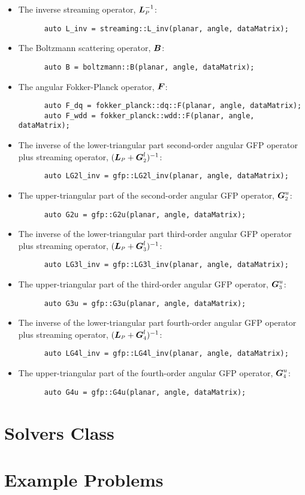 \documentclass[../main.tex]{subfiles}
\begin{document}
\begin{itemize}
    \item The inverse streaming operator, $\Lp^{-1}$:
    \begin{lstlisting}
      auto L_inv = streaming::L_inv(planar, angle, dataMatrix);
    \end{lstlisting}
    \item The Boltzmann scattering operator, $\boldsymbol{B}$:
    \begin{lstlisting}
      auto B = boltzmann::B(planar, angle, dataMatrix);
    \end{lstlisting}
    \item The angular Fokker-Planck operator, $\boldsymbol{F}$:
    \begin{lstlisting}
      auto F_dq = fokker_planck::dq::F(planar, angle, dataMatrix);
      auto F_wdd = fokker_planck::wdd::F(planar, angle, dataMatrix);
    \end{lstlisting}
    \item The inverse of the lower-triangular part second-order angular GFP operator plus streaming operator, $(\Lp+\Gtwo^l)^{-1}$:
    \begin{lstlisting}
      auto LG2l_inv = gfp::LG2l_inv(planar, angle, dataMatrix);
    \end{lstlisting}
    \item The upper-triangular part of the second-order angular GFP operator, $\Gtwo^u$:
    \begin{lstlisting}
      auto G2u = gfp::G2u(planar, angle, dataMatrix);
    \end{lstlisting}
    \item The inverse of the lower-triangular part third-order angular GFP operator plus streaming operator, $(\Lp+\Gthree^l)^{-1}$:
    \begin{lstlisting}
      auto LG3l_inv = gfp::LG3l_inv(planar, angle, dataMatrix);
    \end{lstlisting}
    \item The upper-triangular part of the third-order angular GFP operator, $\Gthree^u$:
    \begin{lstlisting}
      auto G3u = gfp::G3u(planar, angle, dataMatrix);
    \end{lstlisting}
    \item The inverse of the lower-triangular part fourth-order angular GFP operator plus streaming operator, $(\Lp+\Gfour^l)^{-1}$:
    \begin{lstlisting}
      auto LG4l_inv = gfp::LG4l_inv(planar, angle, dataMatrix);
    \end{lstlisting}
    \item The upper-triangular part of the fourth-order angular GFP operator, $\Gfour^u$:
    \begin{lstlisting}
      auto G4u = gfp::G4u(planar, angle, dataMatrix);
    \end{lstlisting}
\end{itemize}

\section{Solvers Class}

\section{Example Problems}
\end{document}
